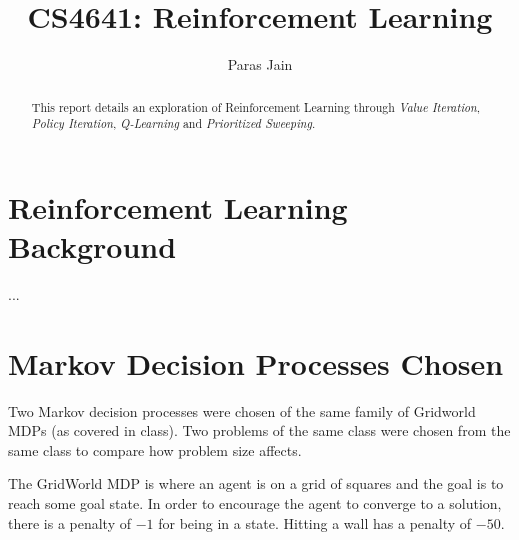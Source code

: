 \documentclass[11pt]{article}
\title{CS4641: Reinforcement Learning}
\author{Paras Jain}
\date{}
\begin{document}
\maketitle

\begin{abstract}
This report details an exploration of Reinforcement Learning through \textit{Value Iteration}, \textit{Policy Iteration}, \textit{Q-Learning} and \textit{Prioritized Sweeping}.
\end{abstract}

\section{Reinforcement Learning Background}
...

\section{Markov Decision Processes Chosen}
Two Markov decision processes were chosen of the same family of Gridworld MDPs (as covered in class). Two problems of the same class were chosen from the same class to compare how problem size affects.

The GridWorld MDP is where an agent is on a grid of squares and the goal is to reach some goal state. In order to encourage the agent to converge to a solution, there is a penalty of $-1$ for being in a state. Hitting a wall has a penalty of $-50$.

\begin{figure}[h]
    \begin{floatrow}
    \end{floatrow}
\end{figure}
\end{document}
